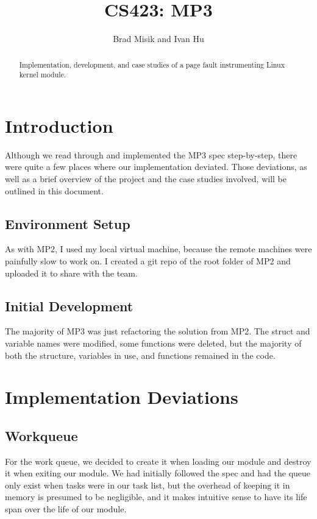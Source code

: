 \documentclass{article}
\begin{document}
\title{CS423: MP3{}}
\author{Brad Misik and Ivan Hu}

\maketitle

\begin{abstract}
Implementation, development, and case studies of a page fault instrumenting Linux kernel module.
\end{abstract}

\section{Introduction}
Although we read through and implemented the MP3 spec step-by-step, there were quite a few places where our implementation deviated. Those deviations, as well as a brief overview of the project and the case studies involved, will be outlined in this document.

\subsection{Environment Setup}
As with MP2, I used my local virtual machine, because the remote machines were painfully slow to work on. I created a git repo of the root folder of MP2 and uploaded it to share with the team.

\subsection{Initial Development}
The majority of MP3 was just refactoring the solution from MP2. The struct and variable names were modified, some functions were deleted, but the majority of both the structure, variables in use, and functions remained in the code.

\section{Implementation Deviations}

\subsection{Workqueue}
For the work queue, we decided to create it when loading our module and destroy it when exiting our module. We had initially followed the spec and had the queue only exist when tasks were in our task list, but the overhead of keeping it in memory is presumed to be negligible, and it makes intuitive sense to have its life span over the life of our module.
\end{document}

